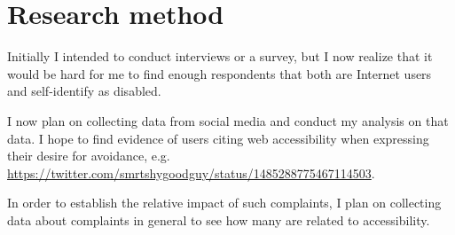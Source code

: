 \section{Research method}

Initially I intended to conduct interviews or a survey, but I now realize that it would
be hard for me to find enough respondents that both are Internet users and self-identify
as disabled.

I now plan on collecting data from social media and conduct my analysis on that data. I
hope to find evidence of users citing web accessibility when expressing their desire for
avoidance, e.g. \url{https://twitter.com/smrtshygoodguy/status/1485288775467114503}.

In order to establish the relative impact of such complaints, I plan on collecting data
about complaints in general to see how many are related to accessibility.
